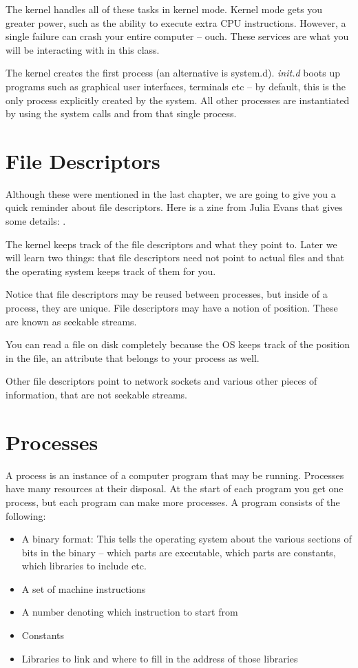 The kernel handles all of these tasks in kernel mode.
Kernel mode gets you greater power, such as the ability to execute extra CPU instructions. 
However, a single failure can crash your entire computer -- ouch.
These services are what you will be interacting with in this class.

The kernel creates the first process  (an alternative is system.d). \emph{init.d} boots up programs such as graphical user interfaces, terminals etc -- by default, this is the only process explicitly created by the system. All other processes are instantiated by using the system calls  and  from that single process.

\section{File Descriptors}

Although these were mentioned in the last chapter, we are going to give you a quick reminder about file descriptors.
Here is a zine from Julia Evans that gives some details: \cite{evans_2018}.

The kernel keeps track of the file descriptors and what they point to.
Later we will learn two things: that file descriptors need not point to actual files and that the operating system keeps track of them for you.

Notice that file descriptors may be reused between processes, but inside of a process, they are unique.
File descriptors may have a notion of position. These are known as seekable streams.

You can read a file on disk completely because the OS keeps track of the position in the file, an attribute that belongs to your process as well.

Other file descriptors point to network sockets and various other pieces of information, that are not seekable streams.

\section{Processes}

A process is an instance of a computer program that may be running.
Processes have many resources at their disposal.
At the start of each program you get one process, but each program can make more processes.
A program consists of the following:

\begin{itemize}
    \item A binary format: This tells the operating system about the various sections of bits in the binary -- which parts are executable, which parts are constants, which libraries to include etc.
    \item A set of machine instructions
    \item A number denoting which instruction to start from
    \item Constants
    \item Libraries to link and where to fill in the address of those libraries
\end{itemize}

